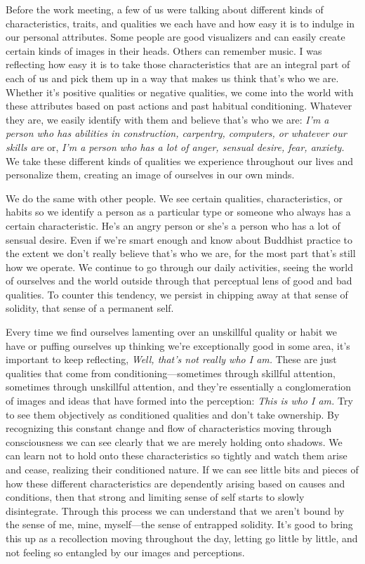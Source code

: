 Before the work meeting, a few of us were talking about different kinds 
of characteristics, traits, and qualities we each have and how easy it 
is to indulge in our personal attributes. Some people are good 
visualizers and can easily create certain kinds of images in their 
heads. Others can remember music. I was reflecting how easy it is to 
take those characteristics that are an integral part of each of us and 
pick them up in a way that makes us think that's who we are. Whether 
it's positive qualities or negative qualities, we come into the world 
with these attributes based on past actions and past habitual 
conditioning. Whatever they are, we easily identify with them and 
believe that's who we are: \emph{I'm a person who has abilities in 
construction, carpentry, computers, or whatever our skills are} or, 
\emph{I'm a person who has a lot of anger, sensual desire, fear, 
anxiety.} We take these different kinds of qualities we experience 
throughout our lives and personalize them, creating an image of 
ourselves in our own minds.

We do the same with other people. We see certain qualities, 
characteristics, or habits so we identify a person as a particular type 
or someone who always has a certain characteristic. He's an angry 
person or she's a person who has a lot of sensual desire. Even if we're 
smart enough and know about Buddhist practice to the extent we don't 
really believe that's who we are, for the most part that's still how we 
operate. We continue to go through our daily activities, seeing the 
world of ourselves and the world outside through that perceptual lens 
of good and bad qualities. To counter this tendency, we persist in 
chipping away at that sense of solidity, that sense of a permanent self.

Every time we find ourselves lamenting over an unskillful quality or 
habit we have or puffing ourselves up thinking we're exceptionally good 
in some area, it's important to keep reflecting, \emph{Well, that's not 
really who I am.} These are just qualities that come from 
conditioning---sometimes through skillful attention, sometimes through 
unskillful attention, and they're essentially a conglomeration of 
images and ideas that have formed into the perception: \emph{This is 
who I am.} Try to see them objectively as conditioned qualities and 
don't take ownership. By recognizing this constant change and flow of 
characteristics moving through consciousness we can see clearly that we 
are merely holding onto shadows. We can learn not to hold onto these 
characteristics so tightly and watch them arise and cease, realizing 
their conditioned nature. If we can see little bits and pieces of how 
these different characteristics are dependently arising based on causes 
and conditions, then that strong and limiting sense of self starts to 
slowly disintegrate. Through this process we can understand that we 
aren't bound by the sense of me, mine, myself---the sense of entrapped 
solidity. It's good to bring this up as a recollection moving 
throughout the day, letting go little by little, and not feeling so 
entangled by our images and perceptions.

